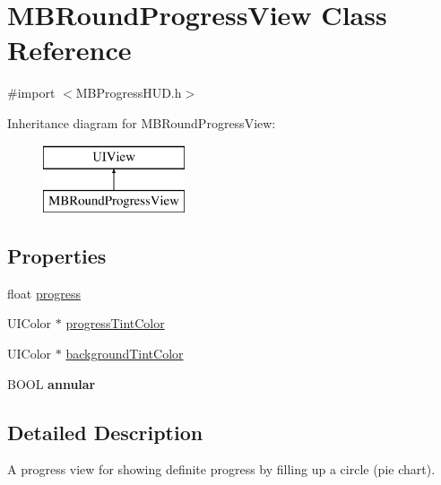 \hypertarget{interface_m_b_round_progress_view}{\section{M\+B\+Round\+Progress\+View Class Reference}
\label{interface_m_b_round_progress_view}
}


{\ttfamily \#import $<$M\+B\+Progress\+H\+U\+D.\+h$>$}

Inheritance diagram for M\+B\+Round\+Progress\+View\+:\begin{figure}[H]
\begin{center}
\leavevmode
\includegraphics[height=2.000000cm]{interface_m_b_round_progress_view}
\end{center}
\end{figure}
\subsection*{Properties}
\begin{DoxyCompactItemize}
\item 
float \hyperlink{interface_m_b_round_progress_view_af92eeb35944c81f406571bc353dc5d5a}{progress}
\item 
U\+I\+Color $\ast$ \hyperlink{interface_m_b_round_progress_view_ae5c8d76a85810a3f843f262bdfff1163}{progress\+Tint\+Color}
\item 
U\+I\+Color $\ast$ \hyperlink{interface_m_b_round_progress_view_ab111d2fa027158e7c21ad411767d193a}{background\+Tint\+Color}
\item 
\hypertarget{interface_m_b_round_progress_view_abac11853dafb3f11426dab6d42834f9c}{B\+O\+O\+L {\bfseries annular}}\label{interface_m_b_round_progress_view_abac11853dafb3f11426dab6d42834f9c}

\end{DoxyCompactItemize}


\subsection{Detailed Description}
A progress view for showing definite progress by filling up a circle (pie chart). 

